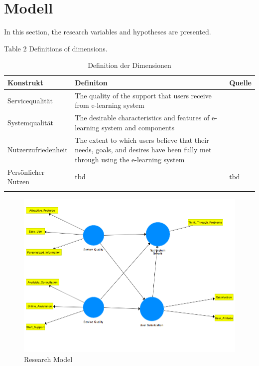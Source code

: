 \section{Modell}
\label{sec:modell}

In this section, the research variables and hypotheses are presented.


Table 2
Definitions of dimensions.

\begin{table}[ht] 
\footnotesize
\caption{Definition der Dimensionen}
\label{tab:Definition der Dimensionen} 
\begin{tabular}{@{}lp{9cm}l@{}} \toprule

\textbf{Konstrukt} & \textbf{Definiton} & \textbf{Quelle} \\ \midrule

Servicequalität & The quality of the support that users receive from e-learning system & \parbox[t]{4cm}{\cite{petter2008measuring}}\\ 
Systemqualität & The desirable characteristics and features of e-learning system and components & \parbox[t]{4cm}{\cite{petter2008measuring}}\\ Nutzerzufriedenheit & The extent to which users believe that their needs, goals, and desires have been fully met through using the e-learning system & \parbox[t]{4cm}{\cite{sanchez2009moderating}}\\ 
Persönlicher Nutzen & \parbox[t]{9cm}{tbd}  & \parbox[t]{4cm}{tbd} \\ \addlinespace 
  \bottomrule

\end{tabular}	
\end{table}


\begin{figure}[h]
\centering
\includegraphics[width=1\textwidth]{Grafiken/Research_Model.png}
\caption{Research Model}
\label{Research Model}
\end{figure}